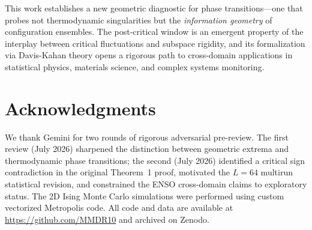 \documentclass[aps,prl,twocolumn,superscriptaddress,byrevtex]{article}
\begin{document}
This work establishes a new geometric diagnostic for phase transitions---one that probes not thermodynamic singularities but the \emph{information geometry} of configuration ensembles. The post-critical window is an emergent property of the interplay between critical fluctuations and subspace rigidity, and its formalization via Davis-Kahan theory opens a rigorous path to cross-domain applications in statistical physics, materials science, and complex systems monitoring.

\section*{Acknowledgments}
We thank Gemini for two rounds of rigorous adversarial pre-review. The first review (July 2026) sharpened the distinction between geometric extrema and thermodynamic phase transitions; the second (July 2026) identified a critical sign contradiction in the original Theorem~1 proof, motivated the $L=64$ multirun statistical revision, and constrained the ENSO cross-domain claims to exploratory status. The 2D Ising Monte Carlo simulations were performed using custom vectorized Metropolis code. All code and data are available at \url{https://github.com/MMDR10} and archived on Zenodo.
\end{document}
